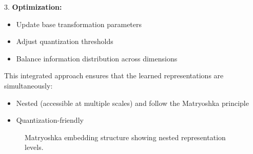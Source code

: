 3. \textbf{Optimization:}
   \begin{itemize}
       \item Update base transformation parameters
       \item Adjust quantization thresholds
       \item Balance information distribution across dimensions
   \end{itemize}

This integrated approach ensures that the learned representations are simultaneously:
\begin{itemize}
    \item Nested (accessible at multiple scales) and follow the Matryoshka principle
    \item Quantization-friendly
\end{itemize}

\begin{figure}[h]
    \centering
    \caption{Matryoshka embedding structure showing nested representation levels.}
    \label{fig:matryoshka_structure}
\end{figure}
